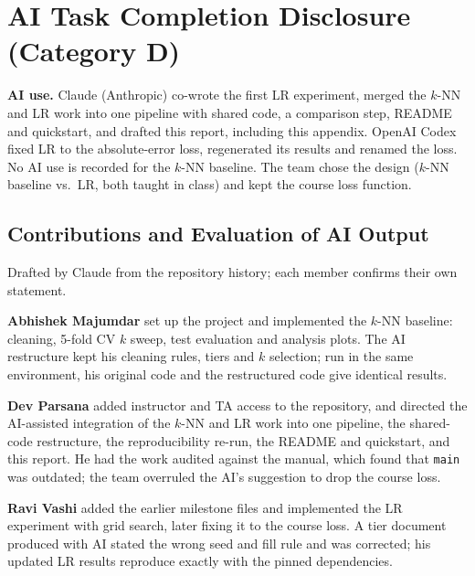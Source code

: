 \documentclass[sigconf,nonacm]{acmart}
\begin{document}
\section{AI Task Completion Disclosure (Category D)}
\textbf{AI use.} Claude (Anthropic) co-wrote the first LR experiment, merged the $k$-NN and LR work into one pipeline with shared code, a comparison step, README and quickstart, and drafted this report, including this appendix. OpenAI Codex fixed LR to the absolute-error loss, regenerated its results and renamed the loss. No AI use is recorded for the $k$-NN baseline. The team chose the design ($k$-NN baseline vs.\ LR, both taught in class) and kept the course loss function.

\subsection{Contributions and Evaluation of AI Output}
\sloppy
Drafted by Claude from the repository history; each member confirms their own statement.

\textbf{Abhishek Majumdar} set up the project and implemented the $k$-NN baseline: cleaning, 5-fold CV $k$ sweep, test evaluation and analysis plots. The AI restructure kept his cleaning rules, tiers and $k$ selection; run in the same environment, his original code and the restructured code give identical results.

\textbf{Dev Parsana} added instructor and TA access to the repository, and directed the AI-assisted integration of the $k$-NN and LR work into one pipeline, the shared-code restructure, the reproducibility re-run, the README and quickstart, and this report. He had the work audited against the manual, which found that \texttt{main} was outdated; the team overruled the AI's suggestion to drop the course loss.

\textbf{Ravi Vashi} added the earlier milestone files and implemented the LR experiment with grid search, later fixing it to the course loss. A tier document produced with AI stated the wrong seed and fill rule and was corrected; his updated LR results reproduce exactly with the pinned dependencies.
\end{document}
